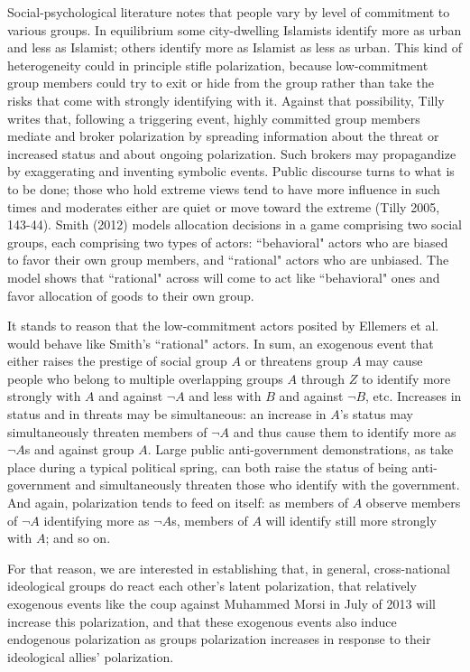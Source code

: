 \documentclass[12pt]{article}
\begin{document}
Social-psychological literature notes that people vary by level of commitment to various groups.   In equilibrium some city-dwelling Islamists identify more as urban and less as Islamist; others identify more as Islamist as less as urban.  This kind of heterogeneity could in principle stifle polarization, because low-commitment group members could try to exit or hide from the group rather than take the risks that come with strongly identifying with it.  Against that possibility, Tilly writes that, following a triggering event, highly committed group members mediate and broker polarization by spreading information about the threat or increased status and about ongoing polarization.   Such brokers may propagandize by exaggerating and inventing symbolic events.  Public discourse turns to what is to be done; those who hold extreme views tend to have more influence in such times and moderates either are quiet or move toward the extreme (Tilly 2005, 143-44).   Smith (2012) models allocation decisions in a game comprising two social groups, each comprising two types of actors:  ``behavioral" actors who are biased to favor their own group members, and ``rational" actors who are unbiased.  The model shows that ``rational" across will come to act like ``behavioral" ones and favor allocation of goods to their own group.  

It stands to reason that the low-commitment actors posited by Ellemers et al. would behave like Smith's ``rational" actors.
In sum, an exogenous event that either raises the prestige of social group $A$ or threatens group $A$ may cause people who belong to multiple overlapping groups $A$ through $Z$ to identify more strongly with $A$ and against $\neg A$ and less with $B$ and against $\neg B$, etc.  Increases in status and in threats may be simultaneous:  an increase in $A$'s status may simultaneously threaten members of $\neg A$ and thus cause them to identify more as $\neg A$s and against group $A$.  Large public anti-government demonstrations, as take place during a typical political spring, can both raise the status of being anti-government and simultaneously threaten those who identify with the government.  And again, polarization tends to feed on itself:  as members of $A$ observe members of $\neg A$ identifying more as $\neg A$s, members of $A$ will identify still more strongly with $A$; and so on. 

For that reason, we are interested in establishing that, in general, cross-national ideological groups do react each other's latent polarization, that relatively exogenous events like the coup against Muhammed Morsi in July of 2013 will increase this polarization, and that these exogenous events also induce endogenous polarization as groups polarization increases in response to their ideological allies' polarization.
\end{document}
